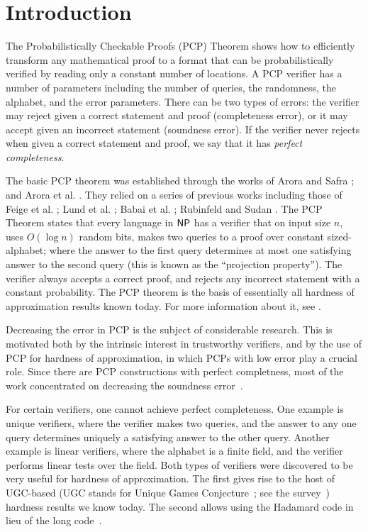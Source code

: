 
\section{Introduction}
\noindent The Probabilistically Checkable Proofs (PCP) Theorem shows
how to efficiently transform any mathematical proof to a format that
can be probabilistically verified by reading only a constant number of
locations. A PCP verifier has a number of parameters including the
number of queries, the randomness, the alphabet, and the error
parameters. There can be two types of errors: the verifier may reject
given a correct statement and proof (completeness error), or it may
accept given an incorrect statement (soundness error).  If the
verifier never rejects when given a correct statement and proof, we
say that it has {\em perfect completeness}.

The basic PCP theorem was established through the works of Arora and
Safra \cite{AS}; and Arora et al. \cite{ALMSS}. They relied on a series of previous works including those of
Feige et al. \cite{FGLSS}; Lund et al. \cite{LFKN}; Babai et
al. \cite{BFL,BFLS}; Rubinfeld and Sudan \cite{RuSu}. The PCP Theorem
states that every language in ${\sf {\sf NP}}$ has a verifier that on input
size $n$, uses $O(\log n)$ random bits, makes two queries to a proof
over constant sized-alphabet; where the answer to the first query
determines at most one satisfying answer to the second query (this is
known as the ``projection property''). The verifier always accepts a
correct proof, and rejects any incorrect statement with a constant
probability.  The PCP theorem is the basis of essentially all hardness
of approximation results known today. For more information about it,
see \cite{D}.

Decreasing the error in PCP is the subject of considerable
research. This is motivated both by the intrinsic interest in
trustworthy verifiers, and by the use of PCP for hardness of
approximation, in which PCPs with low error play a crucial role.
Since there are PCP constructions with perfect completness, most of
the work concentrated on decreasing the soundness
error~\cite{Raz,RaSa,ArSu,DFKRS,MR08,IKW,DM10}.

For certain verifiers, one cannot achieve perfect completeness.  One
example is unique verifiers, where the verifier makes two queries, and
the answer to any one query determines uniquely a satisfying answer to
the other query. Another example is linear verifiers, where the
alphabet is a finite field, and the verifier performs linear tests
over the field.  Both types of verifiers were discovered to be very
useful for hardness of approximation.  The first gives rise to the
host of UGC-based (UGC stands for Unique Games Conjecture~\cite{Khot};
see the survey~\cite{K-Survey}) hardness results we know today. The
second allows using the Hadamard code in lieu of the long
code~\cite{Khot01}.

